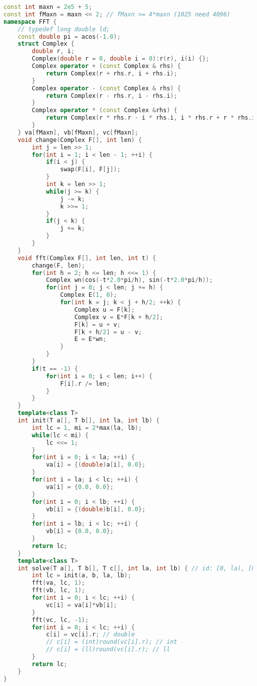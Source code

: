 \begin{lstlisting}[language=C++]
const int maxn = 2e5 + 5;
const int fMaxn = maxn << 2; // fMaxn >= 4*maxn (1025 need 4096)
namespace FFT {
    // typedef long double ld;
    const double pi = acos(-1.0);
    struct Complex {
        double r, i;
        Complex(double r = 0, double i = 0):r(r), i(i) {};
        Complex operator + (const Complex & rhs) {
            return Complex(r + rhs.r, i + rhs.i);
        }
        Complex operator - (const Complex & rhs) {
            return Complex(r - rhs.r, i - rhs.i);
        }
        Complex operator * (const Complex &rhs) {
            return Complex(r * rhs.r - i * rhs.i, i * rhs.r + r * rhs.i);
        }
    } va[fMaxn], vb[fMaxn], vc[fMaxn];
    void change(Complex F[], int len) {
        int j = len >> 1;
        for(int i = 1; i < len - 1; ++i) {
            if(i < j) {
                swap(F[i], F[j]);
            }
            int k = len >> 1;
            while(j >= k) {
                j -= k;
                k >>= 1;
            }
            if(j < k) {
                j += k;
            }
        }
    }
    void fft(Complex F[], int len, int t) {
        change(F, len);
        for(int h = 2; h <= len; h <<= 1) {
            Complex wn(cos(-t*2.0*pi/h), sin(-t*2.0*pi/h));
            for(int j = 0; j < len; j += h) {
                Complex E(1, 0);
                for(int k = j; k < j + h/2; ++k) {
                    Complex u = F[k];
                    Complex v = E*F[k + h/2];
                    F[k] = u + v;
                    F[k + h/2] = u - v;
                    E = E*wn;
                }
            }
        }
        if(t == -1) {
            for(int i = 0; i < len; i++) {
                F[i].r /= len;
            }
        }
    }
    template<class T>
    int init(T a[], T b[], int la, int lb) {
        int lc = 1, mi = 2*max(la, lb);
        while(lc < mi) {
            lc <<= 1;
        }
        for(int i = 0; i < la; ++i) {
            va[i] = {(double)a[i], 0.0};
        }
        for(int i = la; i < lc; ++i) {
            va[i] = {0.0, 0.0};
        }
        for(int i = 0; i < lb; ++i) {
            vb[i] = {(double)b[i], 0.0};
        }
        for(int i = lb; i < lc; ++i) {
            vb[i] = {0.0, 0.0};
        }
        return lc;
    }
    template<class T>
    int solve(T a[], T b[], T c[], int la, int lb) { // id: [0, la), [0, lb), [0, lc)
        int lc = init(a, b, la, lb);
        fft(va, lc, 1);
        fft(vb, lc, 1);
        for(int i = 0; i < lc; ++i) {
            vc[i] = va[i]*vb[i];
        }
        fft(vc, lc, -1);
        for(int i = 0; i < lc; ++i) {
            c[i] = vc[i].r; // double
            // c[i] = (int)round(vc[i].r); // int
            // c[i] = (ll)round(vc[i].r); // ll
        }
        return lc;
    }
}
\end{lstlisting}

